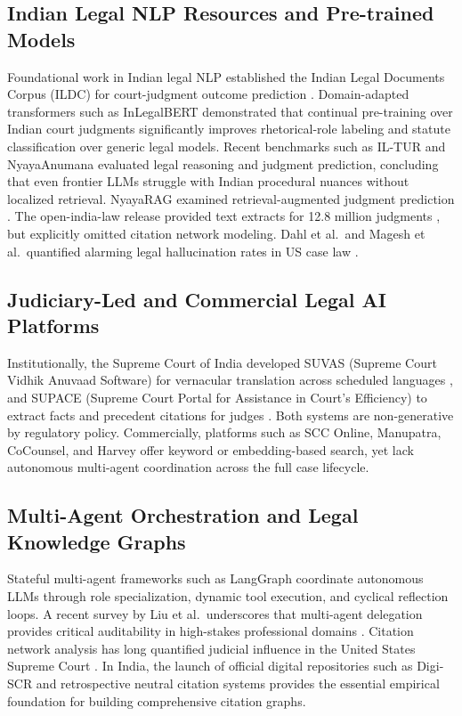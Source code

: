 \documentclass[conference]{IEEEtran}
\begin{document}
\subsection{Indian Legal NLP Resources and Pre-trained Models}
Foundational work in Indian legal NLP established the Indian Legal Documents Corpus (ILDC) for court-judgment outcome prediction \cite{ildc}. Domain-adapted transformers such as InLegalBERT \cite{inlegalbert} demonstrated that continual pre-training over Indian court judgments significantly improves rhetorical-role labeling and statute classification over generic legal models. Recent benchmarks such as IL-TUR \cite{iltur} and NyayaAnumana \cite{nyayaanumana} evaluated legal reasoning and judgment prediction, concluding that even frontier LLMs struggle with Indian procedural nuances without localized retrieval. NyayaRAG examined retrieval-augmented judgment prediction \cite{nyayarag}. The open-india-law release provided text extracts for 12.8 million judgments \cite{openindialaw}, but explicitly omitted citation network modeling. Dahl et al.\ and Magesh et al.\ quantified alarming legal hallucination rates in US case law \cite{dahl2024,magesh2025}.

\subsection{Judiciary-Led and Commercial Legal AI Platforms}
Institutionally, the Supreme Court of India developed SUVAS (Supreme Court Vidhik Anuvaad Software) for vernacular translation across scheduled languages \cite{suvas}, and SUPACE (Supreme Court Portal for Assistance in Court's Efficiency) to extract facts and precedent citations for judges \cite{supace}. Both systems are non-generative by regulatory policy. Commercially, platforms such as SCC Online, Manupatra, CoCounsel, and Harvey offer keyword or embedding-based search, yet lack autonomous multi-agent coordination across the full case lifecycle.

\subsection{Multi-Agent Orchestration and Legal Knowledge Graphs}
Stateful multi-agent frameworks such as LangGraph \cite{langgraph} coordinate autonomous LLMs through role specialization, dynamic tool execution, and cyclical reflection loops. A recent survey by Liu et al.\ underscores that multi-agent delegation provides critical auditability in high-stakes professional domains \cite{liu2026survey}. Citation network analysis has long quantified judicial influence in the United States Supreme Court \cite{fowler2007}. In India, the launch of official digital repositories such as Digi-SCR \cite{digiscr} and retrospective neutral citation systems \cite{scneutral} provides the essential empirical foundation for building comprehensive citation graphs.
\end{document}
